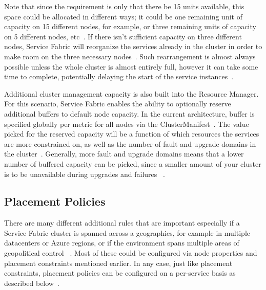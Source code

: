 Note that since the requirement is only that there be 15 units
available, this space could be allocated in different ways; it could
be one remaining unit of capacity on 15 different nodes, for example,
or three remaining units of capacity on 5 different nodes, 
etc~\cite{hid-sp18-501-description}. 
If there isn’t sufficient capacity on three different nodes, Service
Fabric will reorganize the services already in the cluster in order to
make room on the three necessary nodes~\cite{hid-sp18-501-description}. 
Such rearrangement is almost
always possible unless the whole cluster is almost entirely full,
however it can take some time to complete, potentially delaying the
start of the service instances~\cite{hid-sp18-501-description}.

Additional cluster management capacity is also built into
the Resource Manager. For this scenario, Service Fabric enables the ability to 
optionally reserve 
additional buffers to default node capacity. In the current architecture, 
buffer
is specified globally per metric for all nodes via the
ClusterManifest~\cite{hid-sp18-501-description}. 
The value picked for the reserved capacity will be a
function of which resources the services are more constrained on, as
well as the number of fault and upgrade domains in the
cluster~\cite{hid-sp18-501-description}. Generally, more fault and 
upgrade domains means that a lower
number of buffered capacity can be picked, since a smaller amount of
your cluster is to be unavailable during upgrades and failures
~\cite{hid-sp18-501-description}.

\subsection{Placement Policies}
There are many different additional rules that are important
especially if a Service Fabric cluster is spanned across a geographies, 
for example in multiple datacenters or Azure regions, or if the
environment spans multiple areas of geopolitical control
~\cite{hid-sp18-501-placement}. Most of these
could be configured via node properties and placement constraints
mentioned earlier. In any case,
just like placement constraints, placement policies can be configured
on a per-service basis as described below~\cite{hid-sp18-501-placement}.

